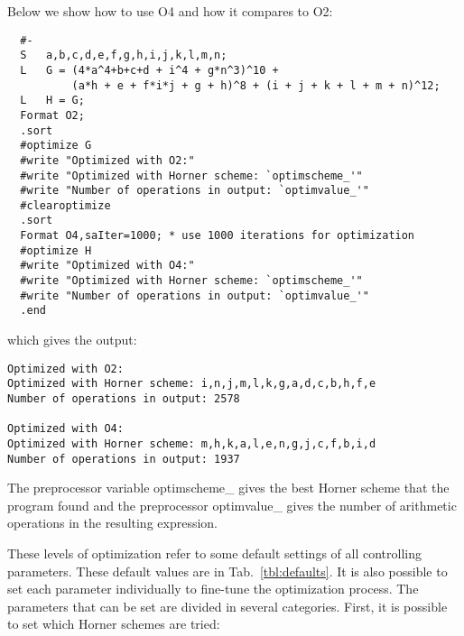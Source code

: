 Below we show how to use O4 and how it compares to O2:
\begin{verbatim}
  #-
  S   a,b,c,d,e,f,g,h,i,j,k,l,m,n;
  L   G = (4*a^4+b+c+d + i^4 + g*n^3)^10 + 
          (a*h + e + f*i*j + g + h)^8 + (i + j + k + l + m + n)^12;
  L   H = G;
  Format O2;
  .sort
  #optimize G
  #write "Optimized with O2:"
  #write "Optimized with Horner scheme: `optimscheme_'"
  #write "Number of operations in output: `optimvalue_'"
  #clearoptimize
  .sort
  Format O4,saIter=1000; * use 1000 iterations for optimization
  #optimize H
  #write "Optimized with O4:"
  #write "Optimized with Horner scheme: `optimscheme_'"
  #write "Number of operations in output: `optimvalue_'"
  .end
\end{verbatim}
which gives the output:
\begin{verbatim}
Optimized with O2:
Optimized with Horner scheme: i,n,j,m,l,k,g,a,d,c,b,h,f,e
Number of operations in output: 2578

Optimized with O4:
Optimized with Horner scheme: m,h,k,a,l,e,n,g,j,c,f,b,i,d
Number of operations in output: 1937
\end{verbatim}

The preprocessor variable optimscheme\_  gives the best Horner scheme that the
program found and the preprocessor optimvalue\_  gives the number of
arithmetic operations in the resulting expression.

These levels of optimization refer to some default settings of all
controlling parameters. These default values are in
Tab.~\ref{tbl:defaults}. It is also possible to set each parameter
individually to fine-tune the optimization process. The parameters
that can be set are divided in several categories. First, it is
possible to set which Horner schemes are tried:

